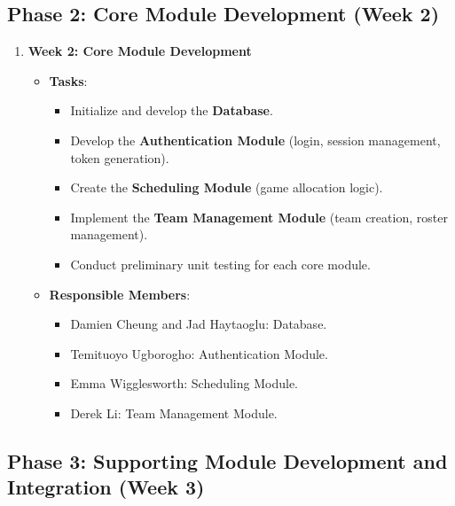 \documentclass[12pt, titlepage]{article}
\begin{document}
\subsection*{Phase 2: Core Module Development (Week 2)}

\begin{enumerate}
    \item \textbf{Week 2: Core Module Development}
    \begin{itemize}
        \item \textbf{Tasks}:
        \begin{itemize}
			\item Initialize and develop the \textbf{Database}.
            \item Develop the \textbf{Authentication Module} (login, session management, token generation).
            \item Create the \textbf{Scheduling Module} (game allocation logic).
            \item Implement the \textbf{Team Management Module} (team creation, roster management).
            \item Conduct preliminary unit testing for each core module.
        \end{itemize}
        \item \textbf{Responsible Members}:
        \begin{itemize}
			\item Damien Cheung and Jad Haytaoglu: Database.
            \item Temituoyo Ugborogho: Authentication Module.
            \item Emma Wigglesworth: Scheduling Module.
            \item Derek Li: Team Management Module.
        \end{itemize}
    \end{itemize}
\end{enumerate}

\subsection*{Phase 3: Supporting Module Development and Integration (Week 3)}
\end{document}
